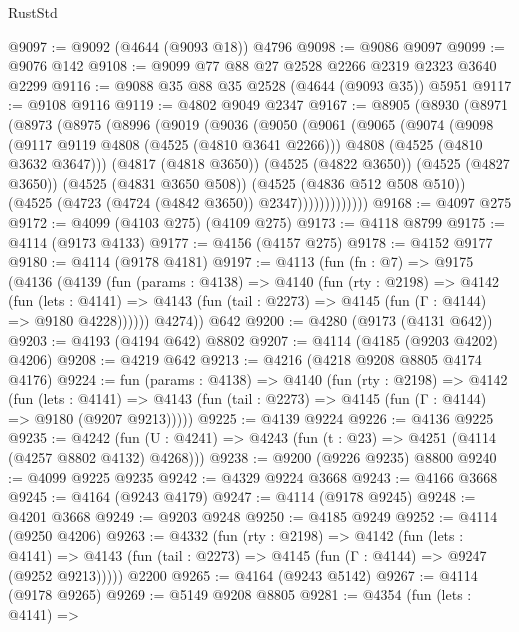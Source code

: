 \begin{lexlean}{RustStd}
\begin{coremodule}
@9097 := @9092 (@4644 (@9093 @18)) @4796
@9098 := @9086 @9097
@9099 := @9076 @142
@9108 := @9099 @77 @88 @27 @2528 @2266 @2319 @2323 @3640 @2299
@9116 := @9088 @35 @88 @35 @2528 (@4644 (@9093 @35)) @5951
@9117 := @9108 @9116
@9119 := @4802 @9049 @2347
@9167 := @8905
    (@8930
      (@8971
        (@8973
          (@8975
            (@8996
              (@9019
                (@9036
                  (@9050
                    (@9061
                      (@9065
                        (@9074
                          (@9098
                            (@9117 @9119 @4808 (@4525 (@4810 @3641 @2266)))
                            @4808
                            (@4525 (@4810 @3632 @3647)))
                          (@4817 (@4818 @3650))
                          (@4525 (@4822 @3650))
                          (@4525 (@4827 @3650))
                          (@4525 (@4831 @3650 @508))
                          (@4525 (@4836 @512 @508 @510))
                          (@4525 (@4723 (@4724 (@4842 @3650)) @2347)))))))))))))
@9168 := @4097 @275
@9172 := @4099 (@4103 @275) (@4109 @275)
@9173 := @4118 @8799
@9175 := @4114 (@9173 @4133)
@9177 := @4156 (@4157 @275)
@9178 := @4152 @9177
@9180 := @4114 (@9178 @4181)
@9197 := @4113
    (fun (fn : @7) =>
    @9175
      (@4136
        (@4139
          (fun (params : @4138) =>
          @4140
            (fun (rty : @2198) =>
            @4142
              (fun (lets : @4141) =>
              @4143 (fun (tail : @2273) => @4145 (fun (Γ : @4144) => @9180 @4228))))))
        @4274))
    @642
@9200 := @4280 (@9173 (@4131 @642))
@9203 := @4193 (@4194 @642) @8802
@9207 := @4114 (@4185 (@9203 @4202) @4206)
@9208 := @4219 @642
@9213 := @4216 (@4218 @9208 @8805 @4174 @4176)
@9224 := fun (params : @4138) =>
  @4140
    (fun (rty : @2198) =>
    @4142
      (fun (lets : @4141) =>
      @4143 (fun (tail : @2273) => @4145 (fun (Γ : @4144) => @9180 (@9207 @9213)))))
@9225 := @4139 @9224
@9226 := @4136 @9225
@9235 := @4242 (fun (U : @4241) => @4243 (fun (t : @23) => @4251 (@4114 (@4257 @8802 @4132) @4268)))
@9238 := @9200 (@9226 @9235) @8800
@9240 := @4099 @9225 @9235
@9242 := @4329 @9224 @3668
@9243 := @4166 @3668
@9245 := @4164 (@9243 @4179)
@9247 := @4114 (@9178 @9245)
@9248 := @4201 @3668
@9249 := @9203 @9248
@9250 := @4185 @9249
@9252 := @4114 (@9250 @4206)
@9263 := @4332
    (fun (rty : @2198) =>
    @4142
      (fun (lets : @4141) =>
      @4143 (fun (tail : @2273) => @4145 (fun (Γ : @4144) => @9247 (@9252 @9213)))))
    @2200
@9265 := @4164 (@9243 @5142)
@9267 := @4114 (@9178 @9265)
@9269 := @5149 @9208 @8805
@9281 := @4354
    (fun (lets : @4141) =>

\end{coremodule}
\end{lexlean}
